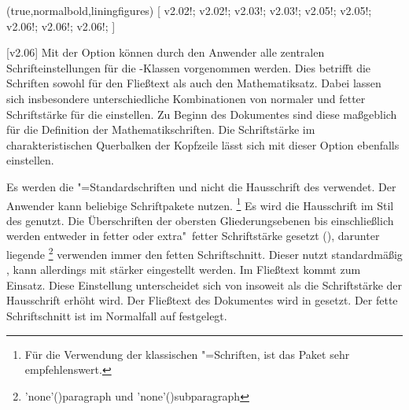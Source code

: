 \begin{DeclareEntity*}{}
\begin{DeclareEntity*}{}
\begin{DeclareEntity*}{}
\begin{Declaration}
  {}
  (true,normalbold,liningfigures)
[%
  v2.02!;
  v2.02!;
  v2.03!;
  v2.03!;
  v2.05!;
  v2.05!;
  v2.06!;
  v2.06!;
  v2.06!;
]
\printdeclarationlist

[v2.06]%
Mit der Option  können durch den Anwender alle zentralen 
Schrifteinstellungen für die \TUDScript-Klassen vorgenommen werden. Dies 
betrifft die Schriften sowohl für den Fließtext als auch den Mathematiksatz.
Dabei lassen sich insbesondere unterschiedliche Kombinationen von normaler und 
fetter Schriftstärke für die \OpenSans einstellen. Zu Beginn des Dokumentes 
sind diese maßgeblich für die Definition der Mathematikschriften. Die 
Schriftstärke im charakteristischen Querbalken der Kopfzeile lässt sich mit 
dieser Option ebenfalls einstellen.
\begin{DeclareValues}{}
  Es werden die "=Standardschriften und nicht die Hausschrift 
  des \CDs verwendet. Der Anwender kann beliebige Schriftpakete nutzen.%
  \footnote{%
    Für die Verwendung der klassischen "=Schriften, ist das 
    Paket  sehr empfehlenswert.%
  }
  Es wird die Hausschrift \OpenSans im Stil des \CDs genutzt. Die Überschriften 
  der obersten Gliederungsebenen bis einschließlich  
  werden entweder in fetter oder extra"~fetter Schriftstärke gesetzt 
  (), darunter liegende%
  \footnote{%
    \Macro'none'(){paragraph} und 
    \Macro'none'(){subparagraph}%
  } verwenden immer den fetten Schriftschnitt. Dieser nutzt standardmäßig 
  , kann allerdings mit  
  stärker eingestellt werden. Im Fließtext kommt  zum 
  Einsatz.
  Diese Einstellung unterscheidet sich von  insoweit als 
  die Schriftstärke der Hausschrift erhöht wird. Der Fließtext des Dokumentes 
  wird in  gesetzt. Der fette Schriftschnitt ist im 
  Normalfall auf  festgelegt.
\end{DeclareValues}


\end{Declaration}
\end{DeclareEntity*}
\end{DeclareEntity*}
\end{DeclareEntity*}
